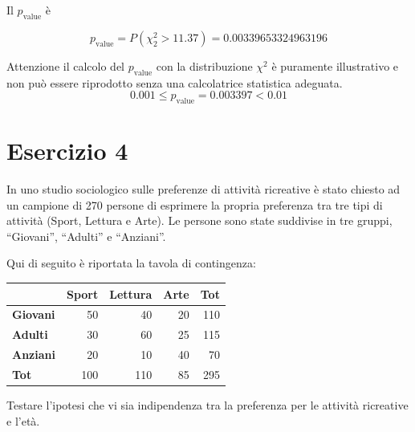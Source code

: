 \documentclass[
  11pt,
]{book}
\theoremstyle{mytheoremstyle}
\theoremstyle{mydefstyle}
\newenvironment{sol}
  {
  \begin{tcolorbox}[enhanced,breakable,arc=0.1mm,boxrule=1pt,colback=white,colframe=iblue,
  title=\bf \fontfamily{lmss}\selectfont \hspace{.5 cm} Soluzione,drop fuzzy shadow]

}{
\end{tcolorbox}
  }
\begin{document}
\begin{sol}
Il \(p_{\text{value}}\) è

\[ p_{\text{value}} = P(\chi^2_{2}>11.37)=0.00339653324963196 \]

Attenzione il calcolo del \(p_\text{value}\) con la distribuzione \(\chi^2\) è puramente illustrativo e non può essere riprodotto senza una calcolatrice statistica adeguata.\[
 0.001 \leq p_\text{value}= 0.003397 < 0.01 
\]

\end{sol}

\section{Esercizio 4}\label{esercizio-4}

In uno studio sociologico sulle preferenze di attività ricreative è stato chiesto ad un campione di 270 persone di esprimere la propria preferenza tra tre tipi di attività (Sport, Lettura e Arte). Le persone sono state suddivise in tre gruppi, ``Giovani'', ``Adulti'' e ``Anziani''.

Qui di seguito è riportata la tavola di contingenza:

\begin{table}[H]
\centering
\begin{tabular}{>{}lrrrr}
\toprule
  & Sport & Lettura & Arte & Tot\\
\midrule
\textbf{Giovani} & 50 & 40 & 20 & 110\\
\textbf{Adulti} & 30 & 60 & 25 & 115\\
\textbf{Anziani} & 20 & 10 & 40 & 70\\
\textbf{Tot} & 100 & 110 & 85 & 295\\
\bottomrule
\end{tabular}
\end{table}

Testare l'ipotesi che vi sia indipendenza tra la preferenza per le attività ricreative e l'età.
\end{document}
